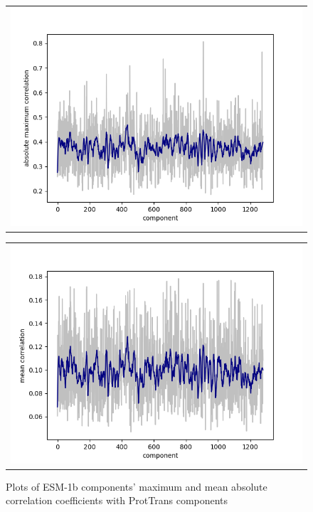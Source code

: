 \documentclass[12pt]{article}
\begin{document}
	\begin{figure}
		\centering
		\begin{tabular}{@{}c@{}}
			\includegraphics[scale=0.85]{validation_small_set_2_joined_correlation_max.png}
		\end{tabular}

		\begin{tabular}{@{}c@{}}
			\includegraphics[scale=0.85]{validation_small_set_2_joined_correlation_mean.png}
		
		\end{tabular}
		
		\caption{Plots of ESM-1b components' maximum and mean absolute correlation coefficients 
		with ProtTrans components}\label{figure:correlationComponentsMaxAndMean}
	\end{figure}
\end{document}
